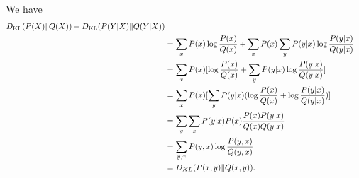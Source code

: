 \begin{answer}
    We have
    $$
    \begin{aligned}
        D_{\text{KL}}(P(X)\|Q(X)) + D_{\text{KL}}(P(Y|X)\|Q(Y|X))\\
        &= \sum_x P(x)\log\frac{P(x)}{Q(x)} +  \sum_x P(x)\sum_y P(y|x)\log\frac{P(y|x)}{Q(y|x)}  \\
        & = \sum_x P(x)[\log\frac{P(x)}{Q(x)} + \sum_y P(y|x)\log\frac{P(y|x)}{Q(y|x)}]\\
        &=  \sum_x P(x)[\sum_y P(y|x)(\log\frac{P(x)}{Q(x)} + \log\frac{P(y|x)}{Q(y|x)})]\\
        &= \sum_y\sum_x P(y|x)P(x)\frac{P(x)P(y|x)}{Q(x)Q(y|x)}\\
        &= \sum_{y,x}P(y,x)\log\frac{P(y,x)}{Q(y,x)}\\
        &= D_{KL}(P(x,y)\| Q(x,y)).
    \end{aligned}
    $$
\end{answer}

